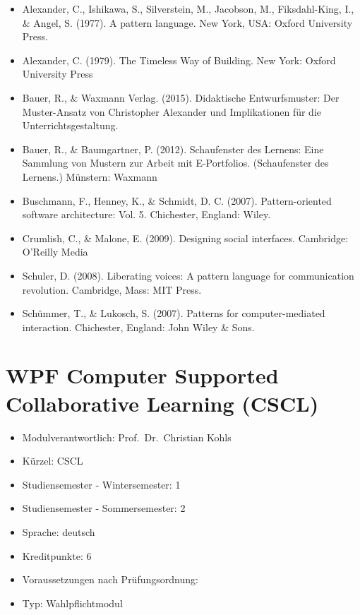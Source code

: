 \begin{itemize}
\item
  Alexander, C., Ishikawa, S., Silverstein, M., Jacobson, M.,
  Fiksdahl-King, I., \& Angel, S. (1977). A pattern language. New York,
  USA: Oxford University Press.
\item
  Alexander, C. (1979). The Timeless Way of Building. New York: Oxford
  University Press
\item
  Bauer, R., \& Waxmann Verlag. (2015). Didaktische Entwurfsmuster: Der
  Muster-Ansatz von Christopher Alexander und Implikationen für die
  Unterrichtsgestaltung.
\item
  Bauer, R., \& Baumgartner, P. (2012). Schaufenster des Lernens: Eine
  Sammlung von Mustern zur Arbeit mit E-Portfolios. (Schaufenster des
  Lernens.) Münstern: Waxmann
\item
  Buschmann, F., Henney, K., \& Schmidt, D. C. (2007). Pattern-oriented
  software architecture: Vol. 5. Chichester, England: Wiley.
\item
  Crumlish, C., \& Malone, E. (2009). Designing social interfaces.
  Cambridge: O'Reilly Media
\item
  Schuler, D. (2008). Liberating voices: A pattern language for
  communication revolution. Cambridge, Mass: MIT Press.
\item
  Schümmer, T., \& Lukosch, S. (2007). Patterns for computer-mediated
  interaction. Chichester, England: John Wiley \& Sons.
\end{itemize}

\chapter{WPF Computer Supported Collaborative Learning
(CSCL)}\label{wpf-computer-supported-collaborative-learning-cscl}

\begin{itemize}
\tightlist
\item
  Modulverantwortlich: Prof.~Dr.~Christian Kohls
\item
  Kürzel: CSCL
\item
  Studiensemester - Wintersemester: 1
\item
  Studiensemester - Sommersemester: 2
\item
  Sprache: deutsch
\item
  Kreditpunkte: 6
\item
  Voraussetzungen nach Prüfungsordnung:
\item
  Typ: Wahlpflichtmodul
\end{itemize}


